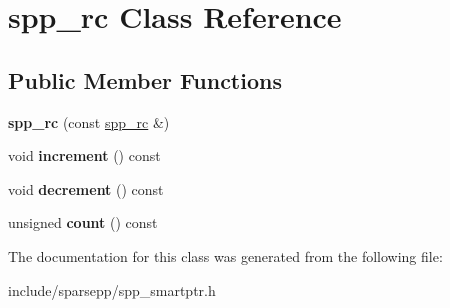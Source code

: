 \hypertarget{classspp__rc}{}\section{spp\+\_\+rc Class Reference}
\label{classspp__rc}
\subsection*{Public Member Functions}
\begin{DoxyCompactItemize}
\item 
{\bfseries spp\+\_\+rc} (const \hyperlink{classspp__rc}{spp\+\_\+rc} \&)\hypertarget{classspp__rc_a33d8319db85ea36c5df059541254a111}{}\label{classspp__rc_a33d8319db85ea36c5df059541254a111}

\item 
void {\bfseries increment} () const \hypertarget{classspp__rc_a97bc323f2914b272be38f3ce9e04a21d}{}\label{classspp__rc_a97bc323f2914b272be38f3ce9e04a21d}

\item 
void {\bfseries decrement} () const \hypertarget{classspp__rc_a46f31082c153f0a26f5b3d7e5bc4555d}{}\label{classspp__rc_a46f31082c153f0a26f5b3d7e5bc4555d}

\item 
unsigned {\bfseries count} () const \hypertarget{classspp__rc_a71573a5d189cf49753c3ccdf9b6bf3e5}{}\label{classspp__rc_a71573a5d189cf49753c3ccdf9b6bf3e5}

\end{DoxyCompactItemize}


The documentation for this class was generated from the following file\+:\begin{DoxyCompactItemize}
\item 
include/sparsepp/spp\+\_\+smartptr.\+h\end{DoxyCompactItemize}
